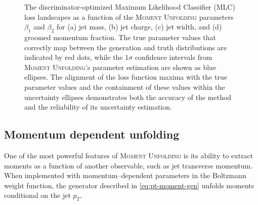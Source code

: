 \begin{figure}
\caption[Loss landscapes showing \textsc{Moment Unfolding} parameter estimation accuracy for unfolding jet substructure variable.]{The discriminator-optimized Maximum Likelihood Classifier (MLC) loss landscapes as a function of the \textsc{Moment Unfolding} parameters $\beta_1$ and $\beta_2$ for (a) jet mass, (b) jet charge, (c) jet width, and (d) groomed momentum fraction. The true parameter values that correctly map between the generation and truth distributions are indicated by red dots, while the $1\sigma$ confidence intervals from \textsc{Moment Unfolding}'s parameter estimation are shown as blue ellipses. The alignment of the loss function maxima with the true parameter values and the containment of these values within the uncertainty ellipses demonstrates both the accuracy of the method and the reliability of its uncertainty estimation.}
    \label{fig:jetexample_loss}
\end{figure}
    
    \subsection{Momentum dependent unfolding}
        One of the most powerful features of \textsc{Moment Unfolding} is its ability to extract moments as a function of another observable, such as jet transverse momentum.
        When implemented with momentum--dependent parameters in the Boltzmann weight function, the generator described in \cref{eq:pt-moment-gen} unfolds moments conditional on the jet \(p_T\).
        
